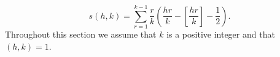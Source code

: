 $$
s(h, k) = \sum_{r=1}^{k-1} \frac{r}{k} \left( \frac{hr}{k} - \left[ \frac{hr}{k} \right] - \frac{1}{2} \right).
$$
Throughout this section we assume that $k$ is a positive integer and that $(h, k) = 1$.
